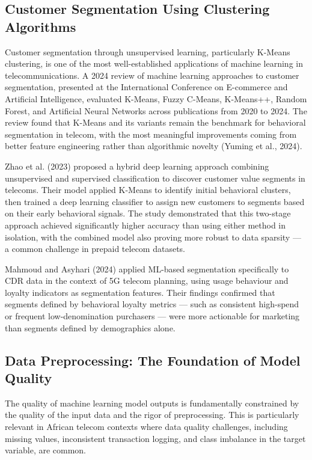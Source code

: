 \subsection{Customer Segmentation Using Clustering Algorithms}

Customer segmentation through unsupervised learning, particularly K-Means clustering, is one of the most well-established applications of machine learning in telecommunications. A 2024 review of machine learning approaches to customer segmentation, presented at the International Conference on E-commerce and Artificial Intelligence, evaluated K-Means, Fuzzy C-Means, K-Means++, Random Forest, and Artificial Neural Networks across publications from 2020 to 2024. The review found that K-Means and its variants remain the benchmark for behavioral segmentation in telecom, with the most meaningful improvements coming from better feature engineering rather than algorithmic novelty (Yuming et al., 2024).

Zhao et al. (2023) proposed a hybrid deep learning approach combining unsupervised and supervised classification to discover customer value segments in telecoms. Their model applied K-Means to identify initial behavioral clusters, then trained a deep learning classifier to assign new customers to segments based on their early behavioral signals. The study demonstrated that this two-stage approach achieved significantly higher accuracy than using either method in isolation, with the combined model also proving more robust to data sparsity --- a common challenge in prepaid telecom datasets.

Mahmoud and Asyhari (2024) applied ML-based segmentation specifically to CDR data in the context of 5G telecom planning, using usage behaviour and loyalty indicators as segmentation features. Their findings confirmed that segments defined by behavioral loyalty metrics --- such as consistent high-spend or frequent low-denomination purchasers --- were more actionable for marketing than segments defined by demographics alone.


\subsection{Data Preprocessing: The Foundation of Model Quality}

The quality of machine learning model outputs is fundamentally constrained by the quality of the input data and the rigor of preprocessing. This is particularly relevant in African telecom contexts where data quality challenges, including missing values, inconsistent transaction logging, and class imbalance in the target variable, are common.


